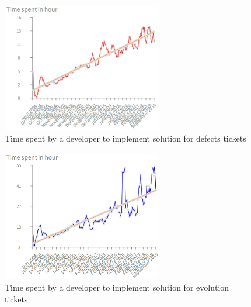 \documentclass[10pt,conference]{IEEEtran}
\begin{document}
\begin{figure}[H]
  \centering
  \includegraphics[width=70mm]{./images/devDefect.png}
  \caption{Time spent by a developer to implement solution for  defects tickets}
  \label{fig:devTimeDefect}
\end{figure}

\begin{figure}[H]
  \centering
  \includegraphics[width=70mm]{./images/devEvol.png}
  \caption{Time spent by a developer to implement solution for  evolution tickets}
  \label{fig:devTimeEvol}
\end{figure}
\end{document}
